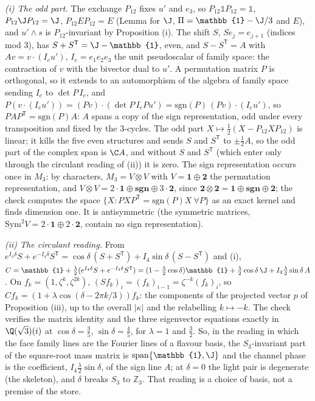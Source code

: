 \emph{(i) The odd part.} The exchange $P_{12}$ fixes $u'$ and $e_{3}$, so $P_{12}\mathbb{1}P_{12} = \mathbb{1}$, $P_{12}\J P_{12} = \J$, $P_{12}EP_{12} = E$ (Lemma  for $\J$, $\Pi = \mathbb{1} - \J/3$ and $E$), and $u'\wedge s$ is $P_{12}$-invariant by Proposition (i). The shift $S$, $Se_{j} = e_{j+1}$ (indices mod $3$), has $S + S^{\mathsf T} = \J - \mathbb{1}$, even, and $S - S^{\mathsf T} = A$ with $Av = v\cdot(I_{e}u')$, $I_{e} = e_{1}e_{2}e_{3}$ the unit pseudoscalar of family space: the contraction of $v$ with the bivector dual to $u'$. A permutation matrix $P$ is orthogonal, so it extends to an automorphism of the algebra of family space sending $I_{e}$ to $\det P\,I_{e}$, and $P(v\cdot(I_{e}u')) = (Pv)\cdot(\det P\,I_{e}Pu') = \mathrm{sgn}(P)\,(Pv)\cdot(I_{e}u')$, so $PAP^{\mathsf T} = \mathrm{sgn}(P)A$: $A$ spans a copy of the sign representation, odd under every transposition and fixed by the $3$-cycles. The odd part $X \mapsto \tfrac12(X - P_{12}XP_{12})$ is linear; it kills the five even structures and sends $S$ and $S^{\mathsf T}$ to $\pm\tfrac12 A$, so the odd part of the complex span is $\C A$, and without $S$ and $S^{\mathsf T}$ (which enter only through the circulant reading of (ii)) it is zero. The sign representation occurs once in $M_{3}$: by characters, $M_{3} = V\otimes V$ with $V = \mathbf{1}\oplus\mathbf{2}$ the permutation representation, and $V\otimes V = 2\cdot\mathbf{1}\oplus\mathbf{sgn}\oplus 3\cdot\mathbf{2}$, since $\mathbf{2}\otimes\mathbf{2} = \mathbf{1}\oplus\mathbf{sgn}\oplus\mathbf{2}$; the check computes the space $\{X : PXP^{\mathsf T} = \mathrm{sgn}(P)X\ \forall P\}$ as an exact kernel and finds dimension one. It is antisymmetric (the symmetric matrices, $\mathrm{Sym}^{2}V = 2\cdot\mathbf{1}\oplus 2\cdot\mathbf{2}$, contain no sign representation).

\emph{(ii) The circulant reading.} From $e^{I_{4}\delta}S + e^{-I_{4}\delta}S^{\mathsf T} = \cos\delta\,(S + S^{\mathsf T}) + I_{4}\sin\delta\,(S - S^{\mathsf T})$ and (i), $C = \mathbb{1} + \tfrac{\lambda}{2}(e^{I_{4}\delta}S + e^{-I_{4}\delta}S^{\mathsf T}) = (1 - \tfrac{\lambda}{2}\cos\delta)\mathbb{1} + \tfrac{\lambda}{2}\cos\delta\,\J + I_{4}\tfrac{\lambda}{2}\sin\delta\,A$. On $f_{k} = (1, \zeta^{k}, \zeta^{2k})$, $(Sf_{k})_{i} = (f_{k})_{i - 1} = \zeta^{-k}(f_{k})_{i}$, so $Cf_{k} = (1 + \lambda\cos(\delta - 2\pi k/3))f_{k}$: the components of the projected vector $p$ of Proposition (iii), up to the overall $|\kappa|$ and the relabelling $k \mapsto -k$. The check verifies the matrix identity and the three eigenvector equations exactly in $\Q(\sqrt3)(i)$ at $\cos\delta = \tfrac35$, $\sin\delta = \tfrac45$, for $\lambda = 1$ and $\tfrac32$. So, in the reading in which the face family lines are the Fourier lines of a flavour basis, the $S_{3}$-invariant part of the square-root mass matrix is $\mathrm{span}\{\mathbb{1}, \J\}$ and the channel phase is the coefficient, $I_{4}\tfrac{\lambda}{2}\sin\delta$, of the sign line $A$; at $\delta = 0$ the light pair is degenerate (the skeleton), and $\delta$ breaks $S_{3}$ to $\mathbb{Z}_{3}$. That reading is a choice of basis, not a premise of the store.

